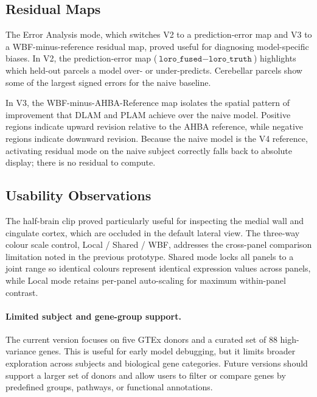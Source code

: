 \documentclass[11pt,letterpaper]{article}
\begin{document}
\subsection{Residual Maps}

The Error Analysis mode, which switches V2 to a prediction-error map and V3
to a WBF-minus-reference residual map, proved useful for diagnosing
model-specific biases.
In V2, the prediction-error map
($\texttt{loro\_fused} - \texttt{loro\_truth}$)
highlights which held-out parcels a model over- or under-predicts.
Cerebellar parcels show some of the largest signed errors for the naive
baseline.

In V3, the WBF-minus-AHBA-Reference map isolates the spatial pattern of
improvement that DLAM and PLAM achieve over the naive model.
Positive regions indicate upward revision relative to the AHBA reference,
while negative regions indicate downward revision.
Because the naive model is the V4 reference, activating residual mode on
the naive subject correctly falls back to absolute display; there is no
residual to compute.

\subsection{Usability Observations}

The half-brain clip proved particularly useful for inspecting the
medial wall and cingulate cortex, which are occluded in the default
lateral view.
The three-way colour scale control, Local / Shared / WBF, addresses the
cross-panel comparison limitation noted in the previous prototype.
Shared mode locks all panels to a joint range so identical colours
represent identical expression values across panels, while Local mode
retains per-panel auto-scaling for maximum within-panel contrast.

\paragraph{Limited subject and gene-group support.}
The current version focuses on five GTEx donors and a curated set of 88
high-variance genes.
This is useful for early model debugging, but it limits broader exploration
across subjects and biological gene categories.
Future versions should support a larger set of donors and allow users to filter
or compare genes by predefined groups, pathways, or functional annotations.

\end{document}
